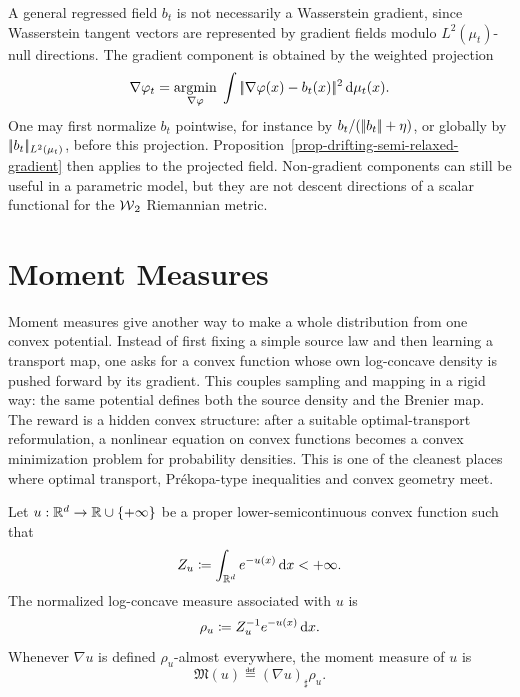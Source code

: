 \begin{rem}
	A general regressed field $b_t$ is not necessarily a Wasserstein gradient, since Wasserstein tangent vectors are represented by gradient fields modulo $L^2(\mu_t)$-null directions. The gradient component is obtained by the weighted projection
	\[
		\nabla\varphi_t
		=
		\underset{\nabla\varphi}{\operatorname{argmin}}\;
		\int |\!| \nabla\varphi(x)-b_t(x) |\!|^2\,\mathrm{d}\mu_t(x).
	\]
	One may first normalize $b_t$ pointwise, for instance by $b_t/(|\!| b_t |\!|+\eta)$, or globally by $|\!| b_t |\!|_{L^2(\mu_t)}$, before this projection. Proposition~\ref{prop-drifting-semi-relaxed-gradient} then applies to the projected field. Non-gradient components can still be useful in a parametric model, but they are not descent directions of a scalar functional for the $\operatorname{\mathcal{W}}_2$ Riemannian metric.
\end{rem}

\section{Moment Measures}
\label{sec-moment-measures}

Moment measures give another way to make a whole distribution from one convex potential. Instead of first fixing a simple source law and then learning a transport map, one asks for a convex function whose own log-concave density is pushed forward by its gradient. This couples sampling and mapping in a rigid way: the same potential defines both the source density and the Brenier map. The reward is a hidden convex structure: after a suitable optimal-transport reformulation, a nonlinear equation on convex functions becomes a convex minimization problem for probability densities. This is one of the cleanest places where optimal transport, Pr\'ekopa-type inequalities and convex geometry meet.

\begin{defn}\label{def-moment-measure}
	Let $u:\mathbb{R}^d\to\mathbb{R}\cup\{+\infty\}$ be a proper lower-semicontinuous convex function such that
	\[
		Z_u\coloneqq \int_{\mathbb{R}^d} e^{-u(x)}\,\mathrm{d} x <+\infty.
	\]
	The normalized log-concave measure associated with $u$ is
	\[
		\rho_u \coloneqq Z_u^{-1} e^{-u(x)}\,\mathrm{d} x.
	\]
	Whenever $\nabla u$ is defined $\rho_u$-almost everywhere, the moment measure of $u$ is
	\[
		\mathfrak M(u)\eqdef (\nabla u)_\sharp \rho_u .
	\]
\end{defn}

